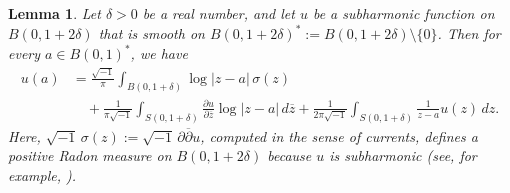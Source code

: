 \documentclass[12pt,twoside]{amsart}
\newtheorem{lem}[thm]{Lemma}
\theoremstyle{definition}
\begin{document}
\begin{lem}
\label{q-lem10.3}
Let $\delta > 0$ be a real number, and let $u$ be a subharmonic function
on $B(0,1+2\delta)$ that is smooth on $B(0,1+2\delta)^* := B(0,1+2\delta) \setminus \{0\}$.  
Then for every $a \in B(0,1)^*$, we have
\begin{equation}\label{q-eq10.5}
\begin{split}
u(a)
&= \frac{\sqrt{-1}}{\pi} \int_{B(0,1+\delta)} \log |z-a| \, \sigma(z) \\
&\quad + \frac{1}{\pi \sqrt{-1}} 
\int_{S(0,1+\delta)} 
\frac{\partial u}{\partial \overline{z}} \log|z-a|\, d\overline{z}
+ \frac{1}{2\pi \sqrt{-1}} \int_{S(0,1+\delta)} \frac{1}{z-a} u(z)\,dz.
\end{split}
\end{equation}
Here, $\sqrt{-1}\, \sigma(z) := \sqrt{-1}\, \partial \overline{\partial} u$, computed 
in the sense of currents, defines a positive Radon measure on $B(0,1+2\delta)$ 
because $u$ is subharmonic {\em{(}}see, 
for example, \cite[(3.1.14) Lemma]{noguchi-ochiai}{\em{)}}.
\end{lem}
\end{document}
